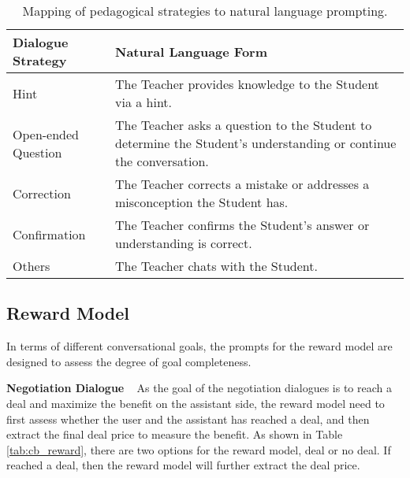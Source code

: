 \documentclass{article} %
\begin{document}
\begin{table}[h]
    \centering
    \begin{tabular}{l|p{10cm}}
        Dialogue Strategy & Natural Language Form \\
        \hline
        Hint & The Teacher provides knowledge to the Student via a hint.\\
        Open-ended Question & The Teacher asks a question to the Student to determine the Student’s understanding or continue the conversation. \\
        Correction & The Teacher corrects a mistake or addresses a misconception the Student has. \\
        Confirmation & The Teacher confirms the Student’s answer or understanding is correct. \\
        Others & The Teacher chats with the Student. \\
    \end{tabular}
    \caption{Mapping of pedagogical strategies to natural language prompting.}
    \label{tab:tutor_strat}
\end{table}


\subsection{Reward Model}\label{app:reward_prompt}

In terms of different conversational goals, the prompts for the reward model are designed to assess the degree of goal completeness. 


\noindent \textbf{Negotiation Dialogue} ~ 
As the goal of the negotiation dialogues is to reach a deal and maximize the benefit on the assistant side, the reward model need to first assess whether the user and the assistant has reached a deal, and then extract the final deal price to measure the benefit. 
As shown in Table \ref{tab:cb_reward}, there are two options for the reward model, deal or no deal. If reached a deal, then the reward model will further extract the deal price. 
\end{document}
